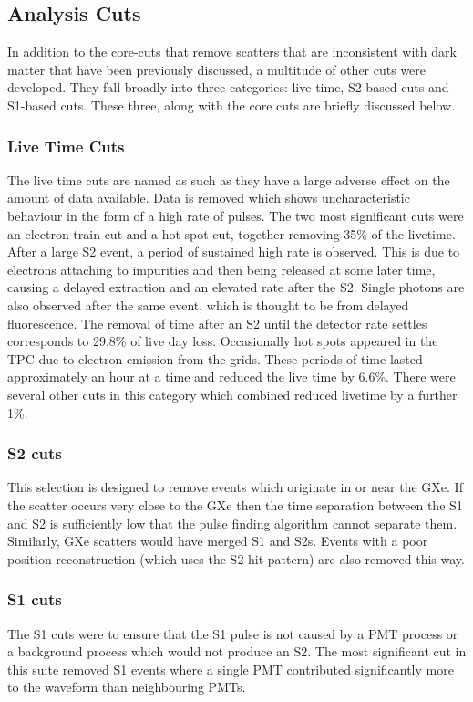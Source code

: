 \subsection{Analysis Cuts}
\par
In addition to the core-cuts that remove scatters that are inconsistent with dark matter that have been previously discussed, a multitude of other cuts were developed.
They fall broadly into three categories: live time, S2-based cuts and S1-based cuts.
These three, along with the core cuts are briefly discussed below.


\subsubsection{Live Time Cuts}
The live time cuts are named as such as they have a large adverse effect on the amount of data available.
Data is removed which shows uncharacteristic behaviour in the form of a high rate of pulses.
The two most significant cuts were an electron-train cut and a hot spot cut, together removing 35\% of the livetime.
After a large S2 event, a period of sustained high rate is observed. 
This is due to electrons attaching to impurities and then being released at some later time, causing a delayed extraction and an elevated rate after the S2.
Single photons are also observed after the same event, which is thought to be from delayed fluorescence.
The removal of time after an S2 until the detector rate settles corresponds to 29.8\% of live day loss.
Occasionally hot spots appeared in the TPC due to electron emission from the grids. 
These periods of time lasted approximately an hour at a time and reduced the live time by 6.6\%.
There were several other cuts in this category which combined reduced livetime by a further 1\%.

\subsubsection{S2 cuts}
This selection is designed to remove events which originate in or near the GXe. 
If the scatter occurs very close to the GXe then the time separation between the S1 and S2 is sufficiently low that the pulse finding algorithm cannot separate them. 
Similarly, GXe scatters would have merged S1 and S2s. 
Events with a poor position reconstruction (which uses the S2 hit pattern) are also removed this way.

\subsubsection{S1 cuts}
The S1 cuts were to ensure that the S1 pulse is not caused by a PMT process or a background process which would not produce an S2.
The most significant cut in this suite removed S1 events where a single PMT contributed significantly more to the waveform than neighbouring PMTs.

